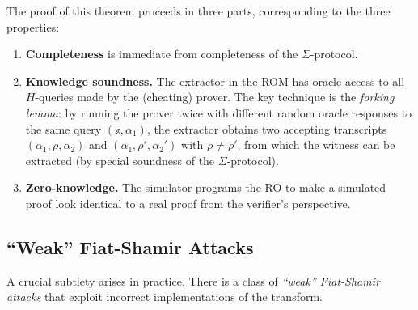 \documentclass[11pt]{article}
\begin{document}
The proof of this theorem proceeds in three parts, corresponding to
the three properties:

\begin{enumerate}
  \item \textbf{Completeness} is immediate from completeness of the
        $\Sigma$-protocol.
  \item \textbf{Knowledge soundness.} The extractor in the ROM has
        oracle access to all $H$-queries made by the (cheating) prover.
        The key technique is the \emph{forking lemma}: by running the
        prover twice with different random oracle responses to the same
        query $(\mathbb{x},\alpha_1)$, the extractor obtains two
        accepting transcripts $(\alpha_1,\rho,\alpha_2)$ and
        $(\alpha_1,\rho',\alpha_2')$ with $\rho \neq \rho'$, from
        which the witness can be extracted (by special soundness of the
        $\Sigma$-protocol).
  \item \textbf{Zero-knowledge.} The simulator programs the RO to
        make a simulated proof look identical to a real proof from the
        verifier's perspective.
\end{enumerate}

\subsection{``Weak'' Fiat-Shamir Attacks}

A crucial subtlety arises in practice.  There is a class of
\emph{``weak'' Fiat-Shamir attacks} that exploit incorrect
implementations of the transform.
\end{document}
